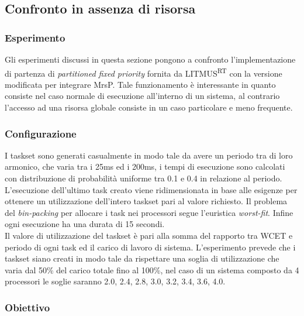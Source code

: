 \subsection{Confronto in assenza di risorsa}
\label{sec:confronto_norisorsa}

\subsubsection{Esperimento}
\label{sec:confronto_norisorsa_exp}

\noindent Gli esperimenti discussi in questa sezione pongono a confronto l'implementazione di partenza di \textit{partitioned fixed priority} fornita da LITMUS\textsuperscript{RT} con la versione modificata per integrare MrsP. Tale funzionamento è interessante in quanto consiste nel caso normale di esecuzione all'interno di un sistema, al contrario l'accesso ad una risorsa globale consiste in un caso particolare e meno frequente.

\subsubsection{Configurazione}
\label{sec:confronto_norisorsa_conf}

\noindent I taskset sono generati casualmente in modo tale da avere un periodo tra di loro armonico, che varia tra i 25ms ed i 200ms, i tempi di esecuzione sono calcolati con distribuzione di probabilità uniforme tra 0.1 e 0.4 in relazione al periodo. L'esecuzione dell'ultimo task creato viene ridimensionata in base alle esigenze per ottenere un utilizzazione dell'intero taskset pari al valore richiesto. Il problema del \textit{bin-packing} per allocare i task nei processori segue l'euristica \textit{worst-fit}. Infine ogni esecuzione ha una durata di 15 secondi.\\

\noindent Il valore di utilizzazione del taskset è pari alla somma del rapporto tra WCET e periodo di ogni task ed il carico di lavoro di sistema. L'esperimento prevede che i taskset siano creati in modo tale da rispettare una soglia di utilizzazione che varia dal 50\% del carico totale fino al 100\%, nel caso di un sistema composto da 4 processori le soglie saranno 2.0, 2.4, 2.8, 3.0, 3.2, 3.4, 3.6, 4.0.

\subsubsection{Obiettivo}
\label{sec:confronto_norisorsa_ob}


